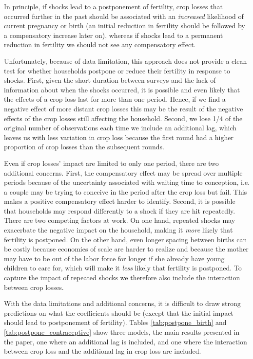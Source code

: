 \documentclass[letterpaper,12pt]{article}
\begin{document}
In principle, if shocks lead to a postponement of fertility,
crop losses that occurred further in the past should be
associated with an \emph{increased} likelihood of current pregnancy 
or birth (an initial reduction in fertility should be followed
by a compensatory increase later on), 
whereas if shocks lead to a permanent reduction in fertility we
should not see any compensatory effect.

Unfortunately, because of data limitation, this approach does not 
provide a clean test for whether households 
postpone or reduce their fertility in response to shocks.
First, given the short duration between surveys and the lack of 
information about when the shocks occurred, it is possible and
even likely that the effects of a crop loss last for more than one period.
Hence, if we find a negative effect of more distant crop losses
this may be the result of the negative effects of the crop losses
still affecting the household.
Second, we lose 1/4 of the original number of observations each 
time we include an additional lag, which leaves us with less variation 
in crop loss because the first round had a higher proportion of crop 
losses than the subsequent rounds.

Even if crop losses' impact are limited to only one period, there 
are two additional concerns.
First, the compensatory effect may be spread over multiple 
periods because of the uncertainty associated with waiting time
to conception, i.e. a couple may be trying to conceive in the
period after the crop loss but fail.
This makes a positive compensatory effect harder to 
identify.
Second, it is possible that households may respond differently to a 
shock if they are hit repeatedly.
There are two competing factors at work.
On one hand, repeated shocks may exacerbate the negative impact on the
household, making it \emph{more} likely that fertility is postponed.
On the other hand, even longer spacing between births can be costly 
because economies of scale are harder to realize and because the 
mother may have to  be out of the labor force for longer if she 
already have young children to care for, which will make it
\emph{less} likely that fertility is postponed.
To capture the impact of repeated shocks we therefore also 
include the interaction between crop losses.






With the data limitations and additional concerns,
it is difficult to draw strong predictions on what the coefficients
should be (except that the initial impact should lead to postponement 
of fertility).
Tables \ref{tab:postpone_birth} and \ref{tab:postpone_contraceptive}
show three models, the main results presented in the paper, one
where an additional lag is included, and one where the interaction
between crop loss and the additional lag in crop loss are included.
\end{document}
